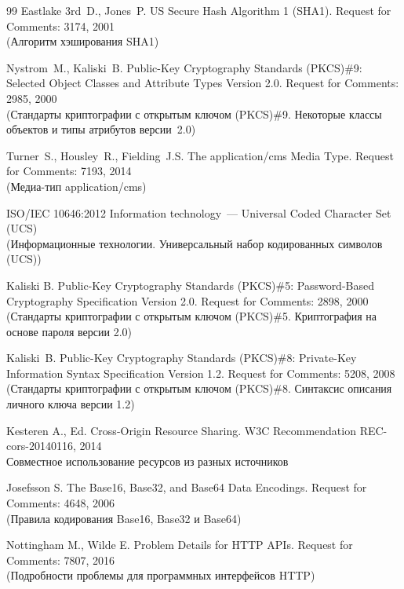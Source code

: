 \begin{thebibliography}{99}
Eastlake 3rd~D., Jones~P.
US Secure Hash Algorithm 1 (SHA1). 
Request for Comments: 3174, 2001\\   
{\small (Алгоритм хэширования SHA1)}

Nystrom~M., Kaliski~B. 
Public-Key Cryptography Standards (PKCS)\#9: 
Selected Object Classes and Attribute Types Version 2.0. Request for 
Comments: 2985, 2000\\ 
{\small (Стандарты криптографии с открытым ключом (PKCS)\#9. 
Некоторые классы объектов и типы атрибутов версии~2.0)}  

Turner~S., Housley~R., Fielding~J.S.  
The application/cms Media Type. 
Request for Comments: 7193, 2014\\ 
{\small (Медиа-тип application/cms)}
\fi

ISO/IEC 10646:2012 Information technology~--- Universal Coded Character 
Set (UCS)\\
{\small (Информационные технологии. Универсальный набор кодированных 
символов (UCS))}

Kaliski B. 
Public-Key Cryptography Standards (PKCS)\#5: 
Password-Based Cryptography Specification Version 2.0. 
Request for Comments: 2898, 2000\\ 
{\small (Стандарты криптографии с открытым ключом (PKCS)\#5. 
Криптография на основе пароля версии 2.0)}  

Kaliski~B. 
Public-Key Cryptography Standards (PKCS)\#8: 
Private-Key Information Syntax Specification Version 1.2. 
Request for Comments: 5208, 2008\\ 
{\small (Стандарты криптографии с открытым ключом (PKCS)\#8.
Синтаксис описания личного ключа версии 1.2)}  

Kesteren A., Ed.
Cross-Origin Resource Sharing. 
W3C Recommendation REC-cors-20140116, 2014\\
{\small Совместное использование ресурсов из разных источников}

Josefsson S.
The Base16, Base32, and Base64 Data Encodings.
Request for Comments: 4648, 2006\\
{\small (Правила кодирования Base16, Base32 и Base64)}  

Nottingham M., Wilde E.
Problem Details for HTTP APIs. 
Request for Comments: 7807, 2016\\
{\small (Подробности проблемы для программных интерфейсов HTTP)}  


\end{thebibliography}
